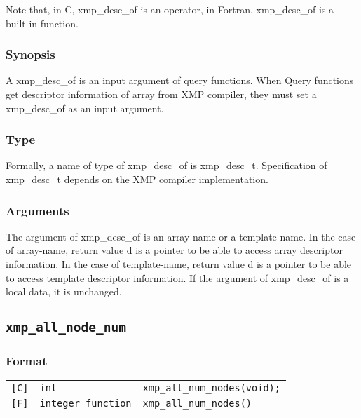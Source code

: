              Note that, in C, xmp\_desc\_of is an operator,
             in Fortran, xmp\_desc\_of is a built-in function.

\subsubsection*{Synopsis}

    A xmp\_desc\_of is an input argument of query functions.
    When Query functions get descriptor information of array
    from XMP compiler, they must set a xmp\_desc\_of as an
    input argument.

\subsubsection*{Type}

    Formally, a name of type of xmp\_desc\_of is xmp\_desc\_t.
    Specification of xmp\_desc\_t depends on the XMP compiler implementation.

\subsubsection*{Arguments}

   The argument of xmp\_desc\_of is an array-name or a template-name.
   In the case of array-name, return value d is a pointer to
   be able to access array descriptor information.
   In the case of template-name, return value d is a pointer to
   be able to access template descriptor information.
   If the argument of xmp\_desc\_of is a local data, it is unchanged.

\vspace{0.3cm}

\subsection{\tt xmp\_all\_node\_num}

\subsubsection*{Format}

\begin{tabular}{lll}

\verb![C]!&  {\tt int}& {\tt xmp\_all\_num\_nodes(void);}\\

\verb![F]!&  {\tt integer function}& {\tt xmp\_all\_num\_nodes()}

\end{tabular}

